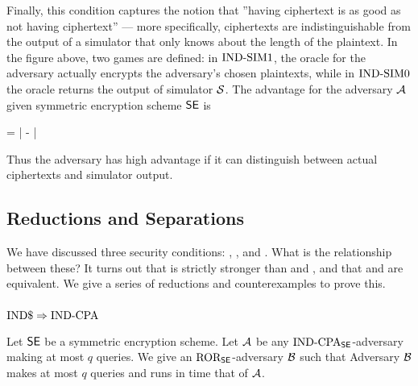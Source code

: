 
Finally, this condition captures the notion that
''having ciphertext is as good as not having ciphertext'' --- more specifically,
ciphertexts are indistinguishable from the output of a simulator that only
knows about the length of the plaintext.
In the figure above, two games are defined: in $\textnormal{IND-SIM}1$, the oracle for the
adversary actually encrypts the adversary's chosen plaintexts, while in
$\textnormal{IND-SIM}0$ the oracle returns the output of simulator ${\cal S}$.
The advantage for the adversary ${\mathcal A}$ given symmetric
encryption scheme $\textnormal{\textsf{SE}}$ is

\bnm
\AdvINDSIM{\SE,\simu}{\advA} = 
    \left| -  \right| 
\enm

Thus the adversary has high advantage if it can distinguish between
actual ciphertexts and simulator output.

\subsection{Reductions and Separations}
\label{sec:randomenc-reduct}

We have discussed three security conditions: \INDRAND, \INDCPA, and \INDSIM.
What is the relationship between these? It turns out that \INDRAND is
strictly stronger than \INDCPA and \INDSIM, and that \INDCPA and \INDSIM are
equivalent. We give a series of reductions and counterexamples to prove this.

\subsubsection*{$\textnormal{IND\$} \Rightarrow \textnormal{IND-CPA}$}

\begin{theorem}
Let ${\mathsf{SE}}$ be a symmetric encryption scheme. Let ${\mathcal A}$ be any
$\textnormal{IND-CPA}_{\mathsf{SE}}$-adversary making at most $q$ queries. 
We give an $\textnormal{ROR}_{\mathsf{SE}}$-adversary ${\mathcal B}$ such that
\bnm
  \AdvINDCPA{\SE}{\advA} \cdotsm\AdvROR{\SE}{\advB}
\enm
Adversary ${\mathcal B}$ makes at most $q$ 
queries and runs in time that of ${\mathcal A}$.
\end{theorem}

